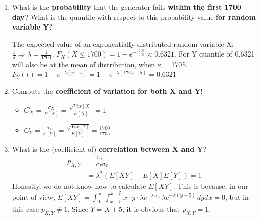 \documentclass{homework}
\begin{document}
\begin{enumerate}[label=(\alph*)]
	\item What is the \textbf{probability} that the generator fails \textbf{within the first 1700 day}? What is the quantile with respect to this probability value \textbf{for random variable Y}?

	The expected value of an exponentially distributed random variable X: $\frac{1}{\lambda} \Rightarrow \lambda = \frac{1}{1700}$. $F_X(X\leq 1700) = 1 - e^{-\frac{1700}{1700}} \approx 0.6321$. \newline For Y quantile of 0.6321 will also be at the mean of distribution, when x = 1705. \newline $F_Y(t) = 1 - e^{-\lambda(y-5)} = 1 - e^{-\lambda(1705-5)}  = 0.6321$

	\item Compute the \textbf{coefficient of variation for both X and Y}!
		\begin{itemize}
			\item $C_X = \frac{\sigma_X}{E[X]} = \frac{\sqrt{Var[X]}}{E[X]} = 1$
			\item $C_Y = \frac{\sigma_Y}{E[Y]} = \frac{\sqrt{Var[Y]}}{E[Y]} = \frac{1700}{1705}$
		\end{itemize}
	\item What is the (coefficient of) \textbf{correlation between X and Y}?
	\begin{align*}
		p_{X,Y} &= \frac{C_{X,Y}}{\sigma_X \sigma_Y} \\
		&= \lambda^2(E[XY] - E[X]E[Y]) = 1
	\end{align*}
	Honestly, we do not know how to calculate $E[XY]$. This is because, in our point of view, $E[XY] = \int_0^\infty \int_{x+5}^{x+5} x\cdot y \cdot \lambda e^{-\lambda x} \cdot \lambda e^{-\lambda (y-5)}\,dydx = 0$, but in this case $p_{X,Y} \neq 1$. Since $Y = X + 5$, it is obvious that $p_{X,Y} = 1$.
\end{enumerate}
\end{document}
